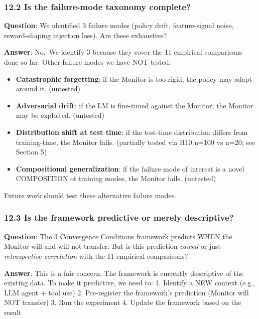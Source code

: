 \documentclass[11pt]{article}
\begin{document}
\subsubsection{12.2 Is the failure-mode taxonomy
complete?}\label{is-the-failure-mode-taxonomy-complete}

\textbf{Question}: We identified 3 failure modes (policy drift,
feature-signal noise, reward-shaping injection loss). Are these
exhaustive?

\textbf{Answer}: No.~We identify 3 because they cover the 11 empirical
comparisons done so far. Other failure modes we have NOT tested:

\begin{itemize}

\item
  \textbf{Catastrophic forgetting}: if the Monitor is too rigid, the
  policy may adapt around it. (untested)
\item
  \textbf{Adversarial drift}: if the LM is fine-tuned against the
  Monitor, the Monitor may be exploited. (untested)
\item
  \textbf{Distribution shift at test time}: if the test-time
  distribution differs from training-time, the Monitor fails. (partially
  tested via H10 n=100 vs n=20; see Section 5)
\item
  \textbf{Compositional generalization}: if the failure mode of interest
  is a novel COMPOSITION of training modes, the Monitor fails.
  (untested)
\end{itemize}

Future work should test these alternative failure modes.

\subsubsection{12.3 Is the framework predictive or merely
descriptive?}\label{is-the-framework-predictive-or-merely-descriptive}

\textbf{Question}: The 3 Convergence Conditions framework predicts WHEN
the Monitor will and will not transfer. But is this prediction
\emph{causal} or just \emph{retrospective correlation} with the 11
empirical comparisons?

\textbf{Answer}: This is a fair concern. The framework is currently
descriptive of the existing data. To make it predictive, we need to: 1.
Identify a NEW context (e.g., LLM agent + tool use) 2. Pre-register the
framework's prediction (Monitor will NOT transfer) 3. Run the experiment
4. Update the framework based on the result
\end{document}
